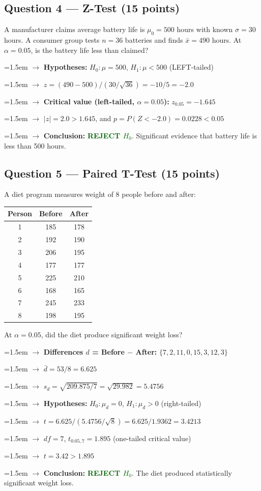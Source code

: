 \documentclass[11pt, letterpaper]{article}
\newcommand{\ans}[1]{\textbf{\textcolor{darkgreen}{#1}}}
\newcommand{\step}[1]{\par\hangindent=1.5em\hangafter=1 $\rightarrow$ #1}
\begin{document}
\subsection*{Question 4 --- Z-Test (15 points)}
A manufacturer claims average battery life is $\mu_0=500$ hours with known $\sigma=30$ hours. A consumer group tests $n=36$ batteries and finds $\bar{x}=490$ hours. At $\alpha=0.05$, is the battery life less than claimed?

\begin{examplebox}
\step{\textbf{Hypotheses:} $H_0: \mu = 500$, $H_1: \mu < 500$ (LEFT-tailed)}
\step{$z = (490-500)/(30/\sqrt{36}) = -10/5 = \mathbf{-2.0}$}
\step{\textbf{Critical value (left-tailed, $\alpha=0.05$):} $z_{0.05} = -1.645$}
\step{$|z| = 2.0 > 1.645$, and $p = P(Z < -2.0) = 0.0228 < 0.05$}
\step{\textbf{Conclusion:} \ans{REJECT $H_0$}. Significant evidence that battery life is less than 500 hours.}
\end{examplebox}

\subsection*{Question 5 --- Paired T-Test (15 points)}
A diet program measures weight of 8 people before and after:

\begin{center}
\small
\begin{tabular}{ccc}
\toprule
\textbf{Person} & \textbf{Before} & \textbf{After} \\
\midrule
1 & 185 & 178 \\
2 & 192 & 190 \\
3 & 206 & 195 \\
4 & 177 & 177 \\
5 & 225 & 210 \\
6 & 168 & 165 \\
7 & 245 & 233 \\
8 & 198 & 195 \\
\bottomrule
\end{tabular}
\end{center}
At $\alpha=0.05$, did the diet produce significant weight loss?

\begin{examplebox}
\step{\textbf{Differences $d$ = Before $-$ After:} $\{7, 2, 11, 0, 15, 3, 12, 3\}$}
\step{$\bar{d} = 53/8 = 6.625$}
\step{$s_d = \sqrt{209.875/7} = \sqrt{29.982} = 5.4756$}
\step{\textbf{Hypotheses:} $H_0: \mu_d = 0$, $H_1: \mu_d > 0$ (right-tailed)}
\step{$t = 6.625/(5.4756/\sqrt{8}) = 6.625/1.9362 = \mathbf{3.4213}$}
\step{$df = 7$, $t_{0.05,7} = 1.895$ (one-tailed critical value)}
\step{$t = 3.42 > 1.895$}
\step{\textbf{Conclusion:} \ans{REJECT $H_0$}. The diet produced statistically significant weight loss.}
\end{examplebox}
\end{document}
